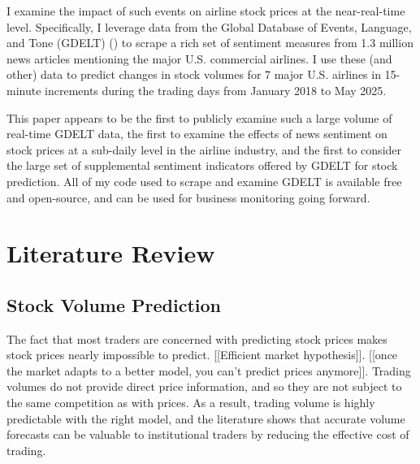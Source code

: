 \documentclass[12pt]{article}
\begin{document}
I examine the impact of such events on airline stock prices at the near-real-time level. Specifically, I leverage data from the Global Database of Events, Language, and Tone (GDELT) (\textcite{leetaru2013gdelt}) to scrape a rich set of sentiment measures from 1.3 million news articles mentioning the major U.S. commercial airlines. I use these (and other) data to predict changes in stock volumes for 7 major U.S. airlines in 15-minute increments during the trading days from January 2018 to May 2025.

This paper appears to be the first to publicly examine such a large volume of real-time GDELT data, the first to examine the effects of news sentiment on stock prices at a sub-daily level in the airline industry, and the first to consider the large set of supplemental sentiment indicators offered by GDELT for stock prediction. All of my code used to scrape and examine GDELT is available free and open-source, and can be used for business monitoring going forward.

\section{Literature Review}

\subsection{Stock Volume Prediction}
The fact that most traders are concerned with predicting stock prices makes stock prices nearly impossible to predict. [[Efficient market hypothesis]]. [[once the market adapts to a better model, you can't predict prices anymore]]. Trading volumes do not provide direct price information, and so they are not subject to the same competition as with prices. As a result, trading volume is highly predictable with the right model, and the literature shows that accurate volume forecasts can be valuable to institutional traders by reducing the effective cost of trading.
\end{document}
